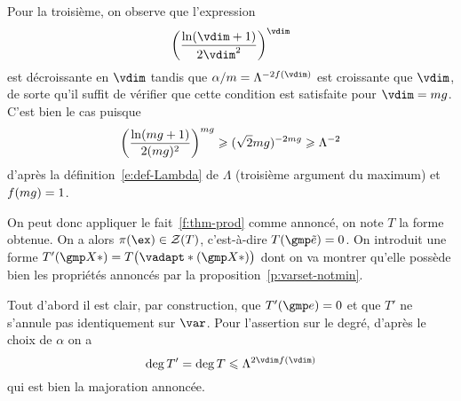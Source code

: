 Pour la troisième, on observe que l'expression
\begin{equation}
  \left( \frac{\ln(\vdim+1)}{2\vdim^2}\right)^\vdim
\end{equation}
est décroissante en \( \vdim \) tandis que \( \alpha / \puiss =
  \Lambda^{-2f(\vdim)} \) est croissante que \( \vdim \), de sorte qu'il
suffit de vérifier que cette condition est satisfaite pour \( \vdim =
  \puiss\genre \). C'est bien le cas puisque
\begin{equation} \label{e:tp-3}
  \left( \frac{\ln(mg + 1)}{2(mg)^2}\right)^{mg}
  \geqslant
  (\sqrt2 mg)^{-2mg}
  \geqslant
  \Lambda^{-2}
\end{equation}
d'après la définition~\eqref{e:def-Lambda} de \( \Lambda \) (troisième
argument du maximum) et \( f(mg) = 1 \).

On peut donc appliquer le fait~\vref{f:thm-prod} comme annoncé, on note \( T \)
la forme obtenue. On a alors \( \pi(\ex) \in \zeros T \), c'est-à-dire \(
  T(\cexa) = 0 \). On introduit une forme \( T'(\vmp*) = T\bigl(
    \vadapt*(\vmp*) \bigr) \) dont on va montrer qu'elle possède bien
les propriétés annoncés par la proposition~\vref{p:varset-notmin}.

Tout d'abord il est clair, par construction, que \( T'(\cex) = 0 \) et que \(
  T' \) ne s'annule pas identiquement sur \( \var \). Pour l'assertion sur le
degré, d'après le choix de \( \alpha \) on a
\begin{equation}
  \deg T' = \deg T \le \Lambda^{2\vdim f(\vdim)}
\end{equation}
qui est bien la majoration annoncée.

